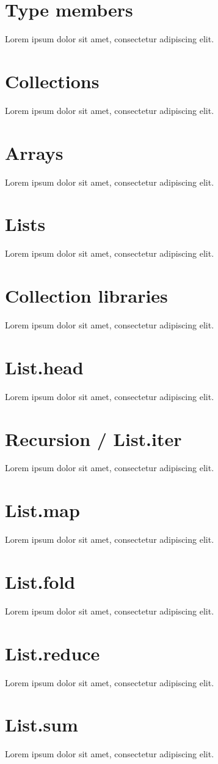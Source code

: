 \documentclass[a4paper,11pt]{article}
\begin{document}
\section{Type members}
Lorem ipsum dolor sit amet, consectetur adipiscing elit.
\section{Collections}
Lorem ipsum dolor sit amet, consectetur adipiscing elit.
\section{Arrays}
Lorem ipsum dolor sit amet, consectetur adipiscing elit.
\section{Lists}
Lorem ipsum dolor sit amet, consectetur adipiscing elit.
\section{Collection libraries}
Lorem ipsum dolor sit amet, consectetur adipiscing elit.
\section{List.head}
Lorem ipsum dolor sit amet, consectetur adipiscing elit.
\section{Recursion / List.iter}
Lorem ipsum dolor sit amet, consectetur adipiscing elit.
\section{List.map}
Lorem ipsum dolor sit amet, consectetur adipiscing elit.
\section{List.fold}
Lorem ipsum dolor sit amet, consectetur adipiscing elit.
\section{List.reduce}
Lorem ipsum dolor sit amet, consectetur adipiscing elit.
\section{List.sum}
Lorem ipsum dolor sit amet, consectetur adipiscing elit.
\end{document}
